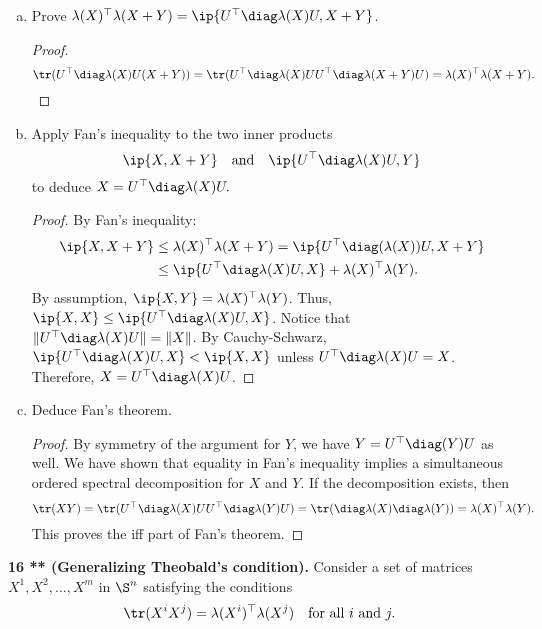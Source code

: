 \documentclass[../borwein-lewis_notes.tex]{subfiles}
\begin{document}
\begin{enumerate}[(a)]
\item Prove $\lambda(X)^\top\lambda(X+Y) = \ip{U^\top\diag\lambda(X)U,
X+Y}$.
\begin{proof}
\begin{equation*}
\tr(U^\top\diag\lambda(X) U (X+Y)) = \tr(U^\top\diag\lambda(X)UU^\top
\diag\lambda(X+Y)U) = \lambda(X)^\top\lambda(X+Y).
\end{equation*}
\end{proof}
\item Apply Fan's inequality to the two inner products 
\begin{equation*}
\ip{X,X+Y} \quad \text{and}\quad \ip{U^\top\diag\lambda(X)U,Y}
\end{equation*}
to deduce $X=U^\top\diag\lambda(X)U.$
\begin{proof}
By Fan's inequality: 
\begin{align*}
\ip{X,X+Y} &\leq \lambda(X)^\top\lambda(X+Y) = \ip{U^\top\diag(\lambda
(X)) U, X+Y}\\
&\leq \ip{U^\top\diag\lambda(X)U, X} + \lambda(X)^\top\lambda(Y).
\end{align*}
By assumption, $\ip{X,Y} = \lambda(X)^\top\lambda(Y)$. Thus, 
$\ip{X,X}\leq\ip{U^\top\diag\lambda(X)U, X}$. Notice that 
$\|U^\top\diag\lambda(X) U\| = \|X\|$. By Cauchy-Schwarz, 
$\ip{U^\top\diag\lambda(X)U, X} < \ip{X,X}$ unless 
$U^\top \diag\lambda(X) U = X$. Therefore, $X = U^\top\diag\lambda(X) U$.
\end{proof}
\item Deduce Fan's theorem.
\begin{proof}
By symmetry of the argument for $Y$, we have $Y=U^\top\diag(Y)U$ as 
well. We have shown that equality in Fan's inequality implies a 
simultaneous ordered spectral decomposition for $X$ and $Y$. 
If the decomposition exists, then 
\begin{equation*}
\tr(XY) = \tr(U^\top\diag\lambda(X)UU^\top\diag\lambda(Y)U) =
 \tr(\diag\lambda(X)\diag\lambda(Y)) = \lambda(X)^\top\lambda(Y).
\end{equation*}
This proves the iff part of Fan's theorem.
\end{proof}
\end{enumerate}\noindent
\textbf{16 ** (Generalizing Theobald's condition).} Consider a set 
of matrices $X^1,X^2,\ldots,X^m$ in $\S^n$ satisfying the conditions 
\begin{equation*}
\tr(X^iX^j) = \lambda(X^i)^\top\lambda(X^j) \quad \text{for all }i
\text{ and } j.
\end{equation*}
\end{document}
